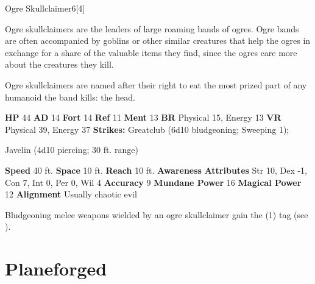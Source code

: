   \begin{monsubsection}{Ogre Skullclaimer}{6}[4]
    \vspace{-1em}\vspace{-1em}
    \vspace{0em}

    
          Ogre skullclaimers are the leaders of large roaming bands of ogres.
          Ogre bands are often accompanied by goblins or other similar creatures that help the ogres in exchange for a share of the valuable items they find, since the ogres care more about the creatures they kill.
        
          Ogre skullclaimers are named after their right to eat the most prized part of any humanoid the band kills: the head.
        

    \begin{spellcontent}
      \begin{spelltargetinginfo}
        \pari \textbf{HP} 44 \monsep
          \textbf{AD} 14 \monsep
          \textbf{Fort} 14 \monsep
          \textbf{Ref} 11 \monsep
          \textbf{Ment} 13
        \pari \textbf{BR} Physical 15, Energy 13 \monsep
        \textbf{VR} Physical 39, Energy 37
        \pari \textbf{Strikes:}
            Greatclub  (6d10 bludgeoning; Sweeping 1);
\par Javelin  (4d10 piercing; 30 ft. range)
      \end{spelltargetinginfo}
    \end{spellcontent}
    \begin{monsterfooter}
      \pari \textbf{Speed} 40 ft. \monsep
        \textbf{Space} 10 ft. \monsep
        \textbf{Reach} 10 ft.
      \pari \textbf{Awareness} 
      \pari \textbf{Attributes}
        Str 10, Dex -1,
        Con 7, Int 0,
        Per 0, Wil 4
      \pari \textbf{Accuracy} 9 \monsep
        \textbf{Mundane Power} 16 \monsep
      \textbf{Magical Power} 12
      \pari \textbf{Alignment} Usually chaotic evil
    \end{monsterfooter}
  \end{monsubsection}
            Bludgeoning melee weapons wielded by an ogre skullclaimer gain the  (1) tag (see ).
  
  
        \newpage
        \section{Planeforged}

